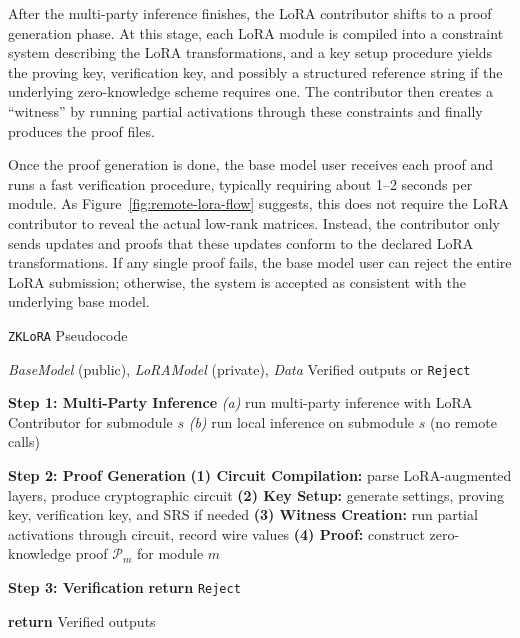 \documentclass[11pt]{article}
\begin{document}
After the multi-party inference finishes, the LoRA contributor shifts to a proof generation phase. At this stage, each LoRA module is compiled into a constraint system describing the LoRA transformations, and a key setup procedure yields the proving key, verification key, and possibly a structured reference string if the underlying zero-knowledge scheme requires one. The contributor then creates a “witness” by running partial activations through these constraints and finally produces the proof files. %

Once the proof generation is done, the base model user receives each proof and runs a fast verification procedure, typically requiring about 1--2 seconds per module. As Figure~\ref{fig:remote-lora-flow} suggests, this does not require the LoRA contributor to reveal the actual low-rank matrices. Instead, the contributor only sends updates and proofs that these updates conform to the declared LoRA transformations. If any single proof fails, the base model user can reject the entire LoRA submission; otherwise, the system is accepted as consistent with the underlying base model. 


\begin{algorithm}[H]
\caption{\texttt{ZKLoRA} Pseudocode}
\label{alg:zklora}
\begin{algorithmic}[1]

\Require \textit{BaseModel} (public), \textit{LoRAModel} (private), \textit{Data}
\Ensure Verified outputs or \texttt{Reject}

\Statex

\State \textbf{Step 1: Multi-Party Inference}
    \State \emph{(a)} run multi-party inference with LoRA Contributor for submodule $s$
  \Else
    \State \emph{(b)} run local inference on submodule $s$ (no remote calls)
  \EndIf
\EndFor

\Statex

\State \textbf{Step 2: Proof Generation}
  \State \textbf{(1) Circuit Compilation:} parse LoRA-augmented layers, produce cryptographic circuit
  \State \textbf{(2) Key Setup:} generate settings, proving key, verification key, and SRS if needed
  \State \textbf{(3) Witness Creation:} run partial activations through circuit, record wire values
  \State \textbf{(4) Proof:} construct zero-knowledge proof $\mathcal{P}_m$ for module $m$
\EndFor

\Statex

\State \textbf{Step 3: Verification}
    \State \textbf{return} \texttt{Reject}
  \EndIf
\EndFor

\State \textbf{return} Verified outputs

\end{algorithmic}
\end{algorithm}
\end{document}
